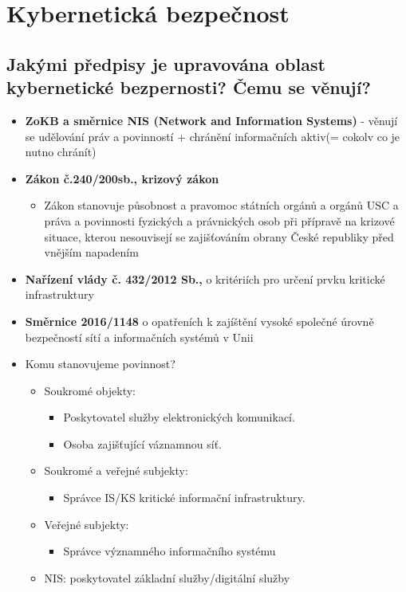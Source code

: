 \section{Kybernetická bezpečnost}

\subsection{Jakými předpisy je upravována oblast kybernetické bezpernosti? Čemu se věnují?}
\begin{itemize}

    \item \textbf{ZoKB a směrnice NIS (Network and Information Systems)} - věnují se udělování práv a povinností + chránění informačních aktiv(= cokolv co je nutno chránít)
    \item \textbf{Zákon č.240/200sb., krizový zákon}
          \begin{itemize}
              \item Zákon stanovuje působnost a pravomoc státních orgánů a orgánů USC a práva a povinnosti fyzických a právnických osob při přípravě na krizové situace, kterou nesouvisejí se zajišťováním obrany České republiky před vnějším napadením
          \end{itemize}
    \item \textbf{Nařízení vlády č. 432/2012 Sb.,} o kritériích pro určení prvku kritické infrastruktury
    \item \textbf{Směrnice 2016/1148} o opatřeních k zajíštění vysoké společné úrovně bezpečností sítí a informačních systémů v Unii
    \item Komu stanovujeme povinnost?
          \begin{itemize}
              \item Soukromé objekty:
                    \begin{itemize}
                        \item Poskytovatel služby elektronických komunikací.
                        \item Osoba zajišťující váznamnou síť.
                    \end{itemize}
              \item Soukromé a veřejné subjekty:
                    \begin{itemize}
                        \item Správce IS/KS kritické informační infrastruktury.
                    \end{itemize}
              \item Veřejné subjekty:
                    \begin{itemize}
                        \item Správce významného informačního systému
                    \end{itemize}
              \item NIS: poskytovatel základní služby/digitální služby
          \end{itemize}
\end{itemize}


